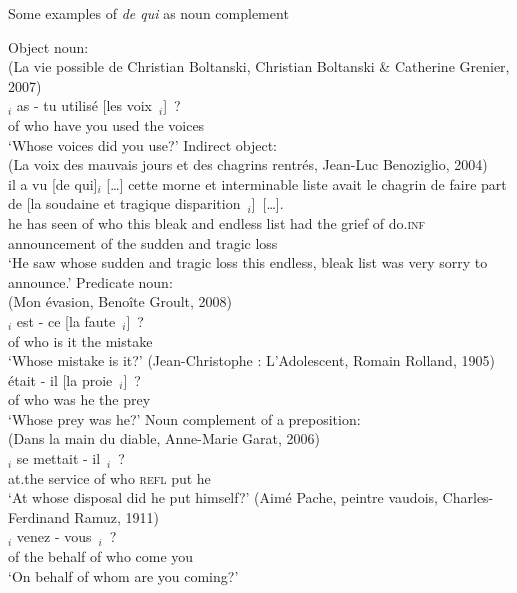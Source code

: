 \begin{exe}
    \ex Some examples of \emph{de qui} as noun complement\label{ex:dq2000-noun-qu}
    \begin{xlist}
        \ex Object noun:\\
(La vie possible de Christian Boltanski, Christian Boltanski \& Catherine Grenier, 2007)\\
\gll [\dots] [de qui]$_i$ as - tu utilisé [les voix~\trace{}$_i$]~?\\
{} of who have {} you used the voices \\
\glt `Whose voices did you use?'
\ex Indirect object:\\
(La voix des mauvais jours et des chagrins rentrés, Jean-Luc Benoziglio, 2004)\\
\gll [\dots] il a vu [de qui]$_i$ [\dots] cette morne et interminable liste avait le chagrin de faire part de [la soudaine et tragique disparition~\trace{}$_i$]~[\dots].\\
{} he has seen of who {} this bleak and endless list had the grief of do\textsc{.inf} announcement of the sudden and tragic loss\\
\glt `He saw whose sudden and tragic loss this endless, bleak list was very sorry to announce.' \label{ex:frantext2000-dequi-indirectobject}
\ex Predicate noun:\\
(Mon évasion, Benoîte Groult, 2008)\\
\gll [De qui]$_i$ est - ce [la faute~\trace{}$_i$]~?\\
of who is {} it the mistake\\
\glt `Whose mistake is it?'
\ex (Jean-Christophe : L'Adolescent, Romain Rolland, 1905)\\
\gll [De qui] était - il [la proie~\trace{}$_i$]~?\\
of who was {} he the prey\\
\glt `Whose prey was he?'
\ex Noun complement of a preposition:\\
(Dans la main du diable, Anne-Marie Garat, 2006)\\
$_i$ se mettait - il~\trace{}$_i$~? \\
{} at.the service of who \textsc{refl} put {} he\\
\glt `At whose disposal did he put himself?'
\ex (Aimé Pache, peintre vaudois, Charles-Ferdinand Ramuz, 1911)\\
$_i$ venez - vous~\trace{}$_i$~?\\
of the behalf of who come {} you\\
\glt `On behalf of whom are you coming?'
    \end{xlist}
\end{exe}

